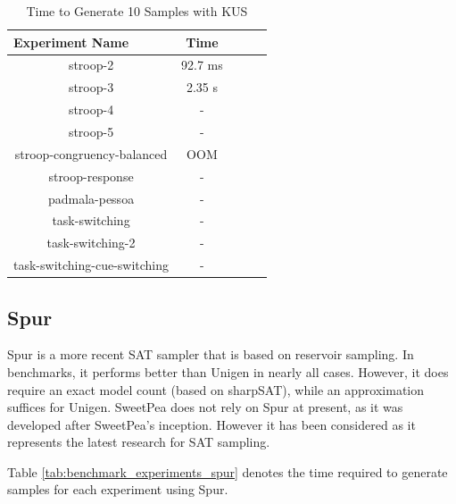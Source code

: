 \begin{table}
  \centering
  \caption{Time to Generate 10 Samples with KUS}
\begin{tabular}{|c|c|c|c|c|}
\hline
\multicolumn{1}{|l|}{Experiment Name} & Time        \\ \hline
stroop-2                              & 92.7 ms     \\ \hline
stroop-3                              & 2.35 s      \\ \hline
stroop-4                              & -           \\ \hline
stroop-5                              & -           \\ \hline
stroop-congruency-balanced            & OOM         \\ \hline  %
stroop-response                       & -           \\ \hline
padmala-pessoa                        & -           \\ \hline
task-switching                        & -           \\ \hline
task-switching-2                      & -           \\ \hline
task-switching-cue-switching          & -           \\ \hline
\end{tabular}
\label{tab:benchmark_experiments_kus}%
\end{table}




\subsection{Spur}

Spur \cite{spur} is a more recent SAT sampler that is based on reservoir sampling. In benchmarks, it performs better than Unigen in nearly all cases. However, it does require an exact model count (based on sharpSAT), while an approximation suffices for Unigen. SweetPea does not rely on Spur at present, as it was developed after SweetPea's inception. However it has been considered as it represents the latest research for SAT sampling.

Table \ref{tab:benchmark_experiments_spur} denotes the time required to generate samples for each experiment using Spur.





